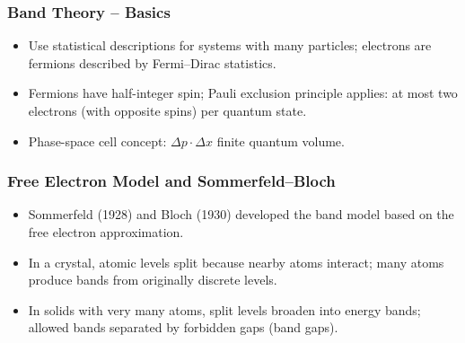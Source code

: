 \documentclass[t,aspectratio=169]{beamer}
\begin{document}
\begin{frame}
\frametitle{Band Theory -- Basics}
\begin{itemize}
  \item Use statistical descriptions for systems with many particles; electrons are fermions described by Fermi–Dirac statistics.
  \item Fermions have half-integer spin; Pauli exclusion principle applies: at most two electrons (with opposite spins) per quantum state.
  \item Phase-space cell concept: $\Delta p \cdot \Delta x$ finite quantum volume.
\end{itemize}
\end{frame}


\begin{frame}
\frametitle{Free Electron Model and Sommerfeld--Bloch}
\begin{itemize}
  \item Sommerfeld (1928) and Bloch (1930) developed the band model based on the free electron approximation.
  \item In a crystal, atomic levels split because nearby atoms interact; many atoms produce bands from originally discrete levels.
  \item In solids with very many atoms, split levels broaden into energy bands; allowed bands separated by forbidden gaps (band gaps).
\end{itemize}
\end{frame}

\end{document}
